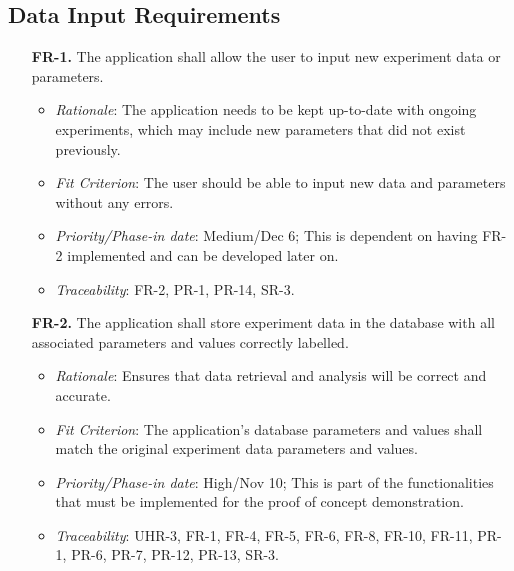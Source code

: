 \documentclass[12pt]{article}
\begin{document}
\subsection{Data Input Requirements}
  \begin{enumerate}
    \item[\textbf{FR-1.}] The application shall allow the user to input new experiment data or parameters.
    \begin{itemize}
    \item \textit{Rationale}: The application needs to be kept up-to-date with ongoing experiments, which may include new parameters that did not exist previously.
    \item \textit{Fit Criterion}: The user should be able to input new data and parameters without any errors.
    \item \textit{Priority/Phase-in date}: Medium/Dec 6; This is dependent on having FR-2 implemented and can be developed later on.
    \item \textit{Traceability}: FR-2, PR-1, PR-14, SR-3.
    \end{itemize}
    \item[\textbf{FR-2.}] The application shall store experiment data in the database with all associated parameters and values correctly labelled.
    \begin{itemize}
      \item \textit{Rationale}: Ensures that data retrieval and analysis will be correct and accurate.
      \item \textit{Fit Criterion}: The application's database parameters and values shall match the original experiment data parameters and values.
      \item \textit{Priority/Phase-in date}: High/Nov 10; This is part of the functionalities that must be implemented for the proof of concept demonstration.
      \item \textit{Traceability}: UHR-3, FR-1, FR-4, FR-5, FR-6, FR-8, FR-10, FR-11, PR-1, PR-6, PR-7, PR-12, PR-13, SR-3.
    \end{itemize}
  \end{enumerate}
\end{document}
